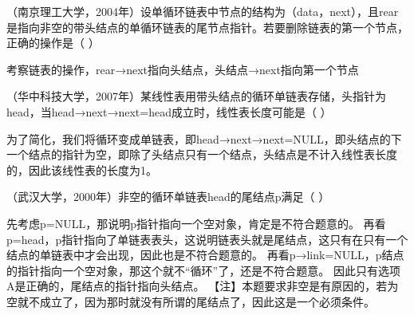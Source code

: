 \question （南京理工大学，2004年）设单循环链表中节点的结构为（data，next），且rear是指向非空的带头结点的单循环链表的尾节点指针。若要删除链表的第一个节点，正确的操作是（
）
\par{}
\begin{solution}考察链表的操作，rear→next指向头结点，头结点→next指向第一个节点
\end{solution}
\question （华中科技大学，2007年）某线性表用带头结点的循环单链表存储，头指针为head，当head→next→next=head成立时，线性表长度可能是（
）
\par{}
\begin{solution}为了简化，我们将循环变成单链表，即head→next→next=NULL，即头结点的下一个结点的指针为空，即除了头结点只有一个结点，头结点是不计入线性表长度的，因此该线性表的长度为1。
\end{solution}
\question （武汉大学，2000年）非空的循环单链表head的尾结点p满足（ ）
\par{}
\begin{solution}先考虑p=NULL，那说明p指针指向一个空对象，肯定是不符合题意的。
再看p=head，p指针指向了单链表表头，这说明链表头就是尾结点，这只有在只有一个结点的单链表中才会出现，因此也是不符合题意的。
再看p→link=NULL，p结点的指针指向一个空对象，那这个就不``循环''了，还是不符合题意。
因此只有选项A是正确的，尾结点的指针指向头结点。
【注】本题要求非空是有原因的，若为空就不成立了，因为那时就没有所谓的尾结点了，因此这是一个必须条件。
\end{solution}
